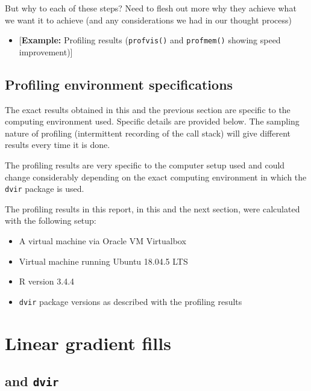 \documentclass[]{article}
\providecommand{\tightlist}{%
  \setlength{\itemsep}{0pt}\setlength{\parskip}{0pt}}
\begin{document}
But why to each of these steps? Need to flesh out more why they achieve
what we want it to achieve (and any considerations we had in our thought
process)

\begin{itemize}
\tightlist
\item
  {[}\textbf{Example:} Profiling results (\texttt{profvis()} and
  \texttt{profmem()} showing speed improvement){]}
\end{itemize}

\subsection{Profiling environment
specifications}\label{profiling-environment-specifications}

The exact results obtained in this and the previous section are specific
to the computing environment used. Specific details are provided below.
The sampling nature of profiling (intermittent recording of the call
stack) will give different results every time it is done.

The profiling results are very specific to the computer setup used and
could change considerably depending on the exact computing environment
in which the \texttt{dvir} package is used.

The profiling results in this report, in this and the next section, were
calculated with the following setup:

\begin{itemize}
\tightlist
\item
  A virtual machine via Oracle VM Virtualbox
\item
  Virtual machine running Ubuntu 18.04.5 LTS
\item
  R version 3.4.4
\item
  \texttt{dvir} package versions as described with the profiling results
\end{itemize}

\newpage{}

\section{Linear gradient fills}\label{linear-gradient-fills}

\subsection{\texorpdfstring{\Tikz{} and
\texttt{dvir}}{ and dvir}}\label{and-dvir}
\end{document}
